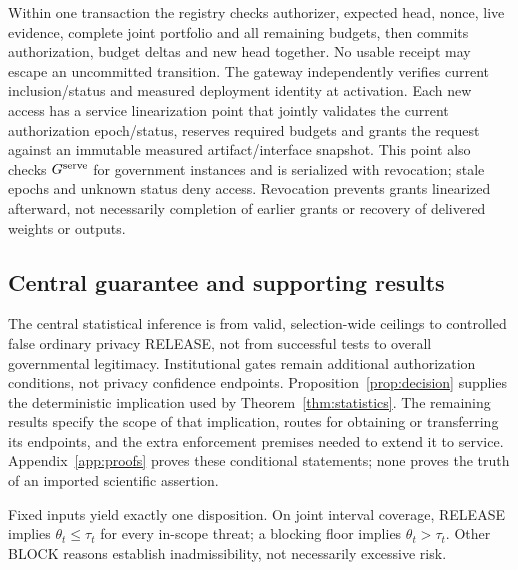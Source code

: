 Within one transaction the registry checks authorizer, expected head, nonce,
live evidence, complete joint portfolio and all remaining budgets, then
commits authorization, budget deltas and new head together. No usable receipt
may escape an uncommitted transition. The gateway independently verifies
current inclusion/status and measured deployment identity at activation.
Each new access has a service linearization point that jointly validates the
current authorization epoch/status, reserves required budgets and grants the
request against an immutable measured artifact/interface snapshot. This point
also checks $G^{\rm serve}$ for government instances and is serialized with
revocation; stale epochs and unknown status deny access.
Revocation prevents grants linearized afterward, not necessarily completion
of earlier grants or recovery of delivered weights or outputs.

\subsection{Central guarantee and supporting results}
The central statistical inference is from valid, selection-wide ceilings to
controlled false ordinary privacy RELEASE, not from successful tests to
overall governmental legitimacy. Institutional gates remain additional
authorization conditions, not privacy confidence endpoints.
Proposition~\ref{prop:decision} supplies the deterministic implication used
by Theorem~\ref{thm:statistics}. The remaining results specify the scope of
that implication, routes for obtaining or transferring its endpoints, and
the extra enforcement premises needed to extend it to service.
Appendix~\ref{app:proofs} proves these conditional statements; none proves
the truth of an imported scientific assertion.

\begin{proposition}
\label{prop:decision}
Fixed inputs yield exactly one disposition. On joint interval coverage,
RELEASE implies $\theta_t\le\tau_t$ for every in-scope threat; a blocking
floor implies $\theta_t>\tau_t$. Other BLOCK reasons establish inadmissibility,
not necessarily excessive risk.
\end{proposition}

